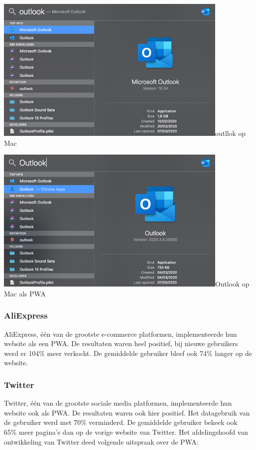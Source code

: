 \includegraphics{./img/Outlook_native.png}{outllok op Mac}

\includegraphics{./img/Outlook_pwa.png}{Outlook op Mac als PWA}

\subsubsection{AliExpress}

AliExpress, één van de grootste e-commerce platformen, implementeerde hun website als een PWA. De resultaten waren heel positief, bij nieuwe gebruikers werd er 104\% meer verkocht. De gemiddelde gebruiker bleef ook 74\% langer op de website.

\autocite{Developers2020}


\subsubsection{Twitter}

Twitter, één van de grootste sociale media platformen, implementeerde hun website ook als PWA. De resultaten waren ook hier positief. Het datagebruik van de gebruiker werd met 70\% verminderd. De gemiddelde gebruiker bekeek ook 65\% meer pagina’s dan op de vorige website van Twitter.
Het afdelingshoofd van ontwikkeling van Twitter deed volgende uitspraak over de PWA:

